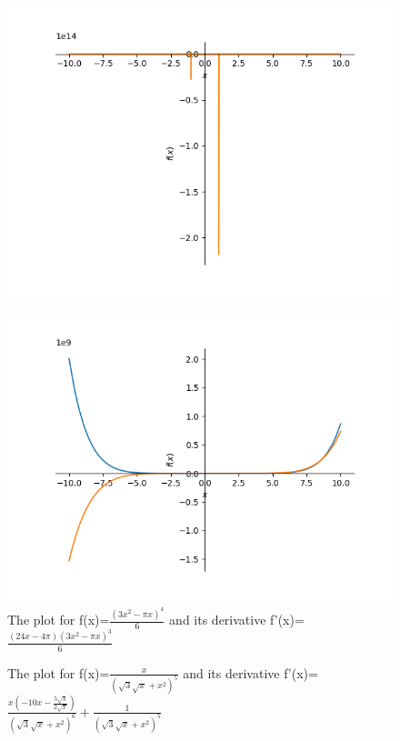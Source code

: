 \documentclass{article}
\begin{document}
\begin{figure}
\includegraphics{plot_16}
\end{figure}\begin{figure}
\caption{The plot for f(x)=$\frac{\left(3 x^{2} - \pi x\right)^{4}}{6}$ and its derivative f'(x)=$\frac{\left(24 x - 4 \pi\right) \left(3 x^{2} - \pi x\right)^{3}}{6}$}
\centering
\includegraphics{plot_17}
\end{figure}\begin{figure}
\caption{The plot for f(x)=$\frac{x}{\left(\sqrt{3} \sqrt{x} + x^{2}\right)^{5}}$ and its derivative f'(x)=$\frac{x \left(- 10 x - \frac{5 \sqrt{3}}{2 \sqrt{x}}\right)}{\left(\sqrt{3} \sqrt{x} + x^{2}\right)^{6}} + \frac{1}{\left(\sqrt{3} \sqrt{x} + x^{2}\right)^{5}}$}
\centering

\end{figure}
\end{document}
